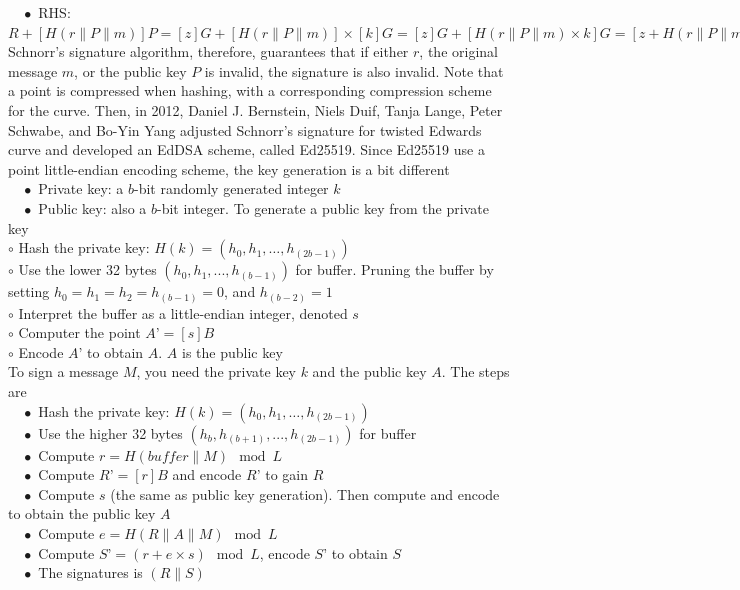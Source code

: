 $\quad\bullet$ RHS: $R + [H(r \| P \| m)] P = [z]G + [H(r \| P \| m)] \times [k]G = [z]G + [H(r \| P \| m) \times k]G = [z + H(r \| P \| m) \times k]G = LH$\\ 
Schnorr’s signature algorithm, therefore, guarantees that if either $r$, the original message $m$, or the public key $P$ is invalid, the signature is also invalid. Note that a point is compressed when hashing, with a corresponding compression scheme for the curve. Then, in 2012, Daniel J. Bernstein, Niels Duif, Tanja Lange, Peter Schwabe, and Bo-Yin Yang adjusted Schnorr’s signature for twisted Edwards curve and developed an EdDSA scheme, called Ed25519. Since Ed25519 use a point little-endian encoding scheme, the key generation is a bit different\\
$\quad\bullet$ Private key: a $b$-bit randomly generated integer $k$\\
$\quad\bullet$ Public key: also a $b$-bit integer. To generate a public key from the private key\\
\vspace{0.5cm} $\circ$ Hash the private key: $H(k) = (h_0, h_1,…, h_(2b-1))$\\
\vspace{0.5cm} $\circ$ Use the lower 32 bytes $(h_0, h_1,..., h_(b-1))$ for buffer. Pruning the buffer by setting $h_0 = h_1 = h_2= h_(b-1) = 0$, and $h_(b-2) = 1$\\
\vspace{0.5cm} $\circ$ Interpret the buffer as a little-endian integer, denoted $s$\\
\vspace{0.5cm} $\circ$ Computer the point $A’ = [s]B$\\
\vspace{0.5cm} $\circ$ Encode $A’$ to obtain $A$. $A$ is the public key\\

To sign a message $M$, you need the private key $k$ and the public key $A$. The steps are\\
$\quad\bullet$ Hash the private key:  $H(k) = (h_0, h_1 ,…, h_(2b-1))$\\
$\quad\bullet$ Use the higher 32 bytes $(h_b, h_(b+1),..., h_(2b-1))$ for buffer\\
$\quad\bullet$ Compute $r = H(buffer \| M) \mod L$\\
$\quad\bullet$ Compute $R’ = [r]B$ and encode $R’$ to gain $R$\\
$\quad\bullet$ Compute $s$ (the same as public key generation). Then compute and encode to obtain the public key $A$\\
$\quad\bullet$ Compute $e = H(R\|A\|M) \mod L$\\
$\quad\bullet$ Compute $S’ = (r+e \times s) \mod L$, encode $S’$ to obtain $S$\\
$\quad\bullet$ The signatures is $(R \| S)$\\

